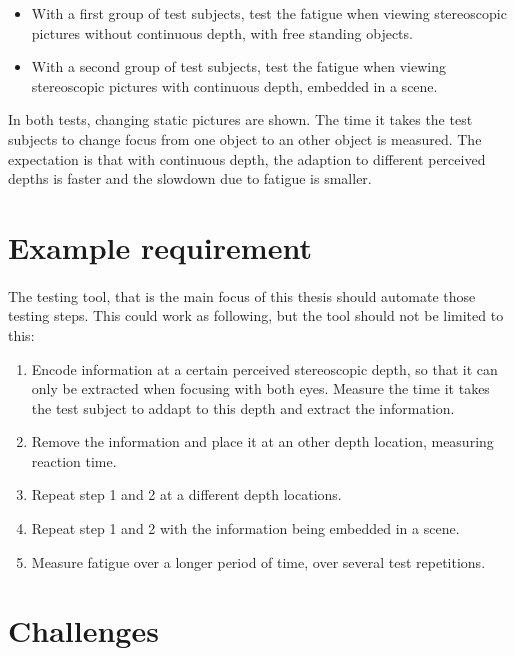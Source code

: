 \documentclass[11pt]{scrartcl}
\begin{document}
\begin{multicols}{2}

\begin{itemize}
\item With a first group of test subjects, test the fatigue when viewing stereoscopic pictures without continuous depth, with free standing objects.
\item With a second group of test subjects, test the fatigue when viewing stereoscopic pictures with continuous depth, embedded in a scene.
\end{itemize}

In both tests, changing static pictures are shown. The time it takes the test subjects to change focus from one object to an other object is measured. The expectation is that with continuous depth, the adaption to different perceived depths is faster and the slowdown due to fatigue is smaller.

\section{Example requirement}
\paragraph{}
The testing tool, that is the main focus of this thesis should automate those testing steps. This could work as following, but the tool should not be limited to this:

\begin{enumerate}
\item Encode information at a certain perceived stereoscopic depth, so that it can only be extracted when focusing with both eyes. Measure the time it takes the test subject to addapt to this depth and extract the information.
\item Remove the information and place it at an other depth location, measuring reaction time.
\item Repeat step 1 and 2 at a different depth locations.
\item Repeat step 1 and 2 with the information being embedded in a scene.
\item Measure fatigue over a longer period of time, over several test repetitions.
\end{enumerate}

\section{Challenges}

\end{multicols}
\end{document}
